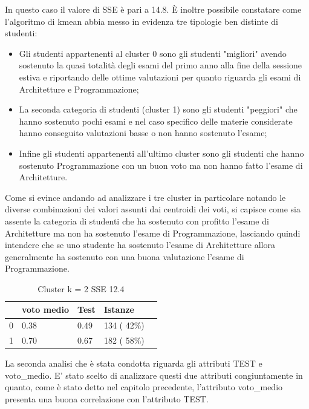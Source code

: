 \documentclass[12pt]{article}
\begin{document}
In questo caso il valore di SSE è pari a 14.8. È inoltre possibile constatare come l'algoritmo di kmean abbia messo in evidenza tre tipologie ben distinte di studenti:
\begin{itemize}
	\item Gli studenti appartenenti al cluster 0 sono gli studenti "migliori" avendo sostenuto la quasi totalità degli esami del primo anno alla fine della sessione estiva e riportando delle ottime valutazioni per quanto riguarda gli esami di Architetture e Programmazione;
	\item La seconda categoria di studenti (cluster 1) sono gli studenti "peggiori" che hanno sostenuto pochi esami e nel caso specifico delle materie considerate hanno conseguito valutazioni basse o non hanno sostenuto l'esame;
	\item Infine gli studenti appartenenti all'ultimo cluster sono gli studenti che hanno sostenuto Programmazione con un buon voto ma non hanno fatto l'esame di Architetture.
\end{itemize}
Come si evince andando ad analizzare i tre cluster in particolare notando le diverse combinazioni dei valori assunti dai centroidi dei voti, si capisce come sia assente la categoria di studenti che ha sostenuto con profitto l'esame di Architetture ma non ha sostenuto l'esame di Programmazione,
lasciando quindi intendere che se uno studente ha sostenuto l'esame di Architetture allora generalmente ha sostenuto con una buona valutazione l'esame di Programmazione.



\begin{table}[ht]
	\centering
	\caption{Cluster k = 2 SSE 12.4}
	\label{c2MT}
	\begin{tabular}{@{}lllll@{}}
	\toprule
	  & voto medio & Test  & Istanze\\ \midrule
	0 & 0.38       & 0.49  & 134 ( 42\%)\\
	1 & 0.70       & 0.67  & 182 ( 58\%)\\ \bottomrule
	\end{tabular}
\end{table}

La seconda analisi che è stata condotta riguarda gli attributi TEST e voto\_medio. E' stato scelto di analizzare 
questi due attributi congiuntamente in quanto, come è stato detto nel capitolo precedente, l'attributo voto\_medio 
presenta una buona correlazione con l'attributo TEST. 
\end{document}
